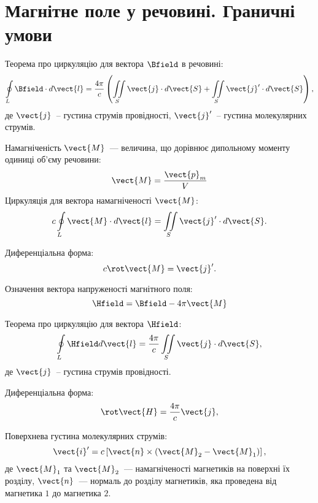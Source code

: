 \section{Магнітне поле у речовині. Граничні умови}

\begin{Theory}\small

  Теорема про циркуляцію для вектора $\Bfield$ в речовині:
  \begin{equation}
	  \oint\limits_{L} \Bfield\cdot d\vect{l} = \frac{4\pi}{c}\left( \iint\limits_S \vect{j} \cdot d\vect{S} + \iint\limits_S \vect{j}'\cdot d\vect{S}\right) ,
  \end{equation}
  де $\vect{j}$~-- густина струмів провідності,  $\vect{j}'$~-- густина молекулярних струмів.

  Намагніченість $\vect{M}$~--- величина, що дорівнює дипольному моменту одиниці об'єму речовини:
	\begin{equation}
		\vect{M} = \frac{\vect{p}_m}{V}
	\end{equation}  	
  Циркуляція для вектора намагніченості $\vect{M}$:
  \begin{equation}
	  c\oint\limits_{L} \vect{M} \cdot d\vect{l} = \iint\limits_S \vect{j}' \cdot d\vect{S}.
  \end{equation}

  Диференціальна форма:
  \begin{equation}
	  c\rot\vect{M} = \vect{j}'.
  \end{equation}


  Означення вектора напруженості магнітного поля:
  \begin{equation}
	  \Hfield = \Bfield - 4\pi\vect{M}
  \end{equation}

  Теорема про циркуляцію для вектора $\Hfield$:
  \begin{equation}
	  \oint\limits_{L} \Hfield d\vect{l} = \frac{4\pi}{c}\iint\limits_S \vect{j} \cdot d\vect{S},
  \end{equation}
де $\vect{j}$~-- густина струмів провідності.
  
Диференціальна форма:
  \begin{equation}
	  \rot\vect{H} = \frac{4\pi}{c}\vect{j},
  \end{equation}

Поверхнева густина молекулярних струмів:
\begin{equation}
	\vect{i}' = c\left[\vect{n}\times(\vect{M}_2 - \vect{M}_1) \right],
\end{equation}
де $\vect{M}_1$ та $\vect{M}_2$~--- намагніченості магнетиків на поверхні їх розділу, $\vect{n}$~--- нормаль до розділу магнетиків, яка проведена від магнетика $1$ до магнетика $2$.


\end{Theory}
